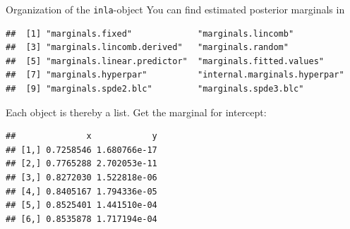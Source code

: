 \documentclass[
  ignorenonframetext,
]{beamer}
\newenvironment{Shaded}{\begin{snugshade}}{\end{snugshade}}
\newcommand{\DecValTok}[1]{\textcolor[rgb]{0.00,0.00,0.81}{#1}}
\newcommand{\FunctionTok}[1]{\textcolor[rgb]{0.00,0.00,0.00}{#1}}
\newcommand{\NormalTok}[1]{#1}
\newcommand{\SpecialCharTok}[1]{\textcolor[rgb]{0.00,0.00,0.00}{#1}}
\begin{document}
\begin{frame}[fragile]{Organization of the \texttt{inla}-object}
\protect\hypertarget{organization-of-the-inla-object-2}{}
You can find estimated posterior marginals in \small

\begin{verbatim}
##  [1] "marginals.fixed"             "marginals.lincomb"          
##  [3] "marginals.lincomb.derived"   "marginals.random"           
##  [5] "marginals.linear.predictor"  "marginals.fitted.values"    
##  [7] "marginals.hyperpar"          "internal.marginals.hyperpar"
##  [9] "marginals.spde2.blc"         "marginals.spde3.blc"
\end{verbatim}

\normalsize

Each object is thereby a list. Get the marginal for intercept:

\scriptsize

\begin{Shaded}
\end{Shaded}

\begin{verbatim}
##              x            y
## [1,] 0.7258546 1.680766e-17
## [2,] 0.7765288 2.702053e-11
## [3,] 0.8272030 1.522818e-06
## [4,] 0.8405167 1.794336e-05
## [5,] 0.8525401 1.441510e-04
## [6,] 0.8535878 1.717194e-04
\end{verbatim}

\normalsize
\end{frame}
\end{document}
